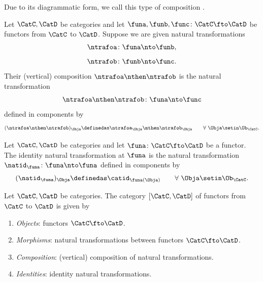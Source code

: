 
Due to its diagrammatic form, we call this type of composition .
\begin{ctdefinition}\label{def:composition-of-naturali-tranformations}
    Let $\CatC, \CatD$ be categories and let $\funa, \funb, \func \colon \CatC \fto \CatD$ be functors from $\CatC$ to $\CatD$.
    Suppose we are given natural transformations
    \begin{equation}
        \ntrafoa \colon \funa \nto \funb,
    \end{equation}
    \begin{equation}
        \ntrafob \colon \funb \nto \func.
    \end{equation}
    Their (vertical) composition $\ntrafoa \nthen \ntrafob$ is the natural transformation
    \begin{equation}
        \ntrafoa \nthen \ntrafob \colon \funa \nto \func
    \end{equation}
    defined in components by
    \begin{equation}\label{eq:nat-trafo-composition}
        (\ntrafoa \nthen \ntrafob)_\Obja \definedas \ntrafoa_\Obja \mthen \ntrafob_\Obja \quad \quad \forall \ \Obja \setin \Ob_\CatC.
    \end{equation}
\end{ctdefinition}

\begin{ctdefinition}\label{def:identity-natural-transformation}
    Let $\CatC, \CatD$ be categories and let $\funa \colon \CatC \fto \CatD$ be a functor.
    The identity natural transformation at $\funa$ is the natural transformation $\natid_\funa \colon \funa \nto \funa$ defined in components by
    \begin{equation}\label{eq:identity-nat-trafo-def}
        (\natid_\funa)_\Obja \definedas \catid_{\funa(\Obja)} \quad \quad \forall \ \Obja \setin\Ob_\CatC.
    \end{equation}
\end{ctdefinition}

\begin{ctdefinition}\label{def:category-of-functors}
    Let $\CatC, \CatD$ be categories.
    The category $[\CatC, \CatD]$ of functors from $\CatC$ to $\CatD$ is given by
    \begin{enumerate}
        \item \emph{Objects}: functors $\CatC \fto \CatD$.
        \item \emph{Morphisms}: natural transformations between functors $\CatC \fto \CatD$.
        \item \emph{Composition}: (vertical) composition of natural transformations.
        \item \emph{Identities}: identity natural transformations.
    \end{enumerate}
\end{ctdefinition}

